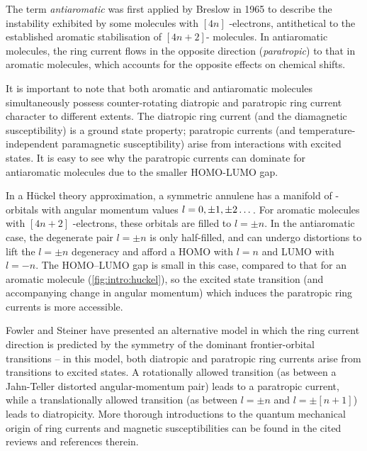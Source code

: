		The term \textit{antiaromatic} was first applied by Breslow in 1965 to describe the instability exhibited by some molecules with $[4n]$ \pii{}-electrons, antithetical to the established aromatic stabilisation of $[4n+2]$-\pii{} molecules.\autocite{Breslow1965} In antiaromatic molecules, the ring current flows in the opposite direction (\textit{paratropic}) to that in aromatic molecules,\autocite{Steiner2001} which accounts for the opposite effects on chemical shifts.

		It is important to note that both aromatic and antiaromatic molecules simultaneously possess counter-rotating diatropic and paratropic ring current character to different extents. The diatropic ring current (and the diamagnetic susceptibility) is a ground state property; paratropic currents (and temperature-independent paramagnetic susceptibility) arise from interactions with excited states.\autocite{Longuet-Higgins1967} It is easy to see why the paratropic currents can dominate for antiaromatic molecules due to the smaller HOMO-LUMO gap. 

		In a H\"uckel theory approximation, a symmetric annulene has a manifold of \pii{}-orbitals with angular momentum values $l = 0, \pm{}1, \pm{}2 \mathellipsis{}$. For aromatic molecules with $[4n+2]$ \pii{}-electrons, these orbitals are filled to $l=\pm n$. In the antiaromatic case, the degenerate pair $l=\pm n$ is only half-filled, and can undergo distortions to lift the $l=\pm n$ degeneracy and afford a HOMO with $l = n$ and LUMO with $l = -n$. The HOMO--LUMO gap is small in this case, compared to that for an aromatic molecule (\autoref{fig:intro:huckel}), so the excited state transition (and accompanying change in angular momentum) which induces the paratropic ring currents is more accessible.\autocite{Longuet-Higgins1967,Pople1966} 

		Fowler and Steiner have presented an alternative model in which the ring current direction is predicted by the symmetry of the dominant frontier-orbital transitions -- in this model, both diatropic and paratropic ring currents arise from transitions to excited states. A rotationally allowed transition (as between a Jahn-Teller distorted angular-momentum pair) leads to a paratropic current, while a translationally allowed transition (as between $l=\pm{}n$ and $l=\pm [n+1]$) leads to diatropicity.\autocite{Fowler2001,Steiner2001} More thorough introductions to the quantum mechanical origin of ring currents and magnetic susceptibilities can be found in the cited reviews and references therein.\autocite{Lazzeretti2000,Gomes2001}

